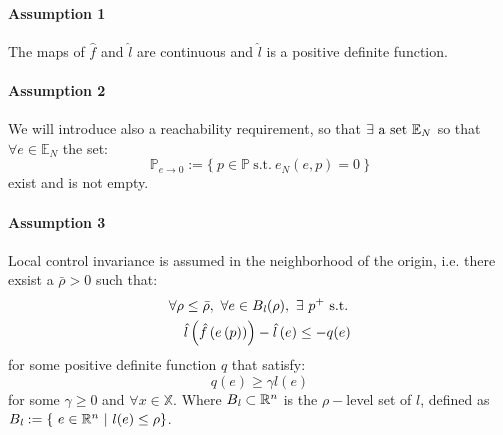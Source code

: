 \paragraph{Assumption 1} The maps of $\hat{f}$ and $\hat{l}$ are continuous and $\hat{l}$ is a positive definite function. 

\paragraph{Assumption 2} We will introduce also a reachability requirement, so that $\exists \textnormal{ a set } \mathbb{E}_N$ so that $\forall e \in \mathbb{E}_N $ the set:
\begin{equation*}
	\mathbb{P}_{e \to 0}:=\lbrace \ p \in \mathbb{P}\ \text{s.t.}\ e_{N}(e,p)=0\ \rbrace
\end{equation*} exist and is not empty.

\paragraph{Assumption 3} Local control invariance is assumed in the neighborhood of the origin, i.e. there exsist a $\bar{\rho} > 0$ such that:
\begin{equation}
	\begin{split}
		\forall \rho &\leq \bar{\rho},\ \forall e \in B_{\it{l}}(\rho),\ \exists\ p^+\ 	 \textnormal{s.t.} \\
		&\hat{l}\left(\hat{f}\left(e\left(p\right)\right)\right)-\hat{l}\left(e\right) \leq -q(e) 
		\label{ass3}
	\end{split}
\end{equation}
for some positive definite function $q$ that satisfy:
\begin{equation}
	q(e) \ge \gamma l(e)
	\label{ass3_1} 
\end{equation}
for some $\gamma \geq 0$ and $\forall x \in \mathbb{X}$.
Where $B_{\it{l}} \subset \mathbb{R}^n$ is the $\rho-$level set of $l$, defined as $B_{\it{l}} := \lbrace\ e \in \mathbb{R}^n\ |\ l(e) \leq \rho \rbrace$.

